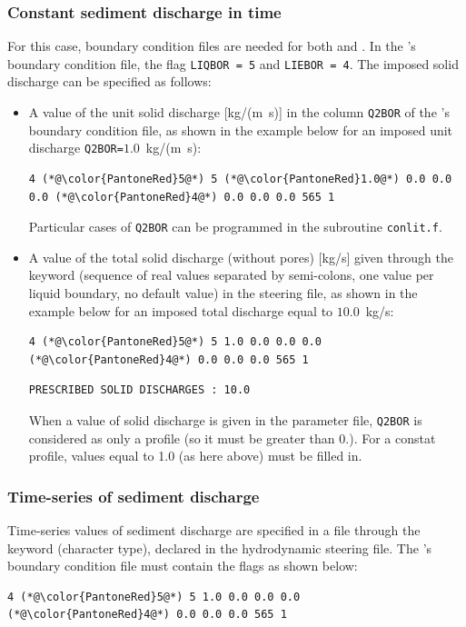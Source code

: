 \subsubsection{Constant sediment discharge in time}
For this case, boundary condition files are needed for both  and \gaia{}. In the \gaia{}'s boundary condition file, the flag \texttt{LIQBOR = 5} and \texttt{LIEBOR = 4}. The imposed solid discharge can be specified as follows:
\begin{itemize}
\item A value of the unit solid discharge [kg/(m~s)] in the column \texttt{Q2BOR} of the \gaia{}'s boundary condition file, as shown in the example below for an imposed unit discharge \texttt{Q2BOR=}$1.0$~kg/(m~s):
\begin{lstlisting}[frame=trBL]
4 (*@\color{PantoneRed}5@*) 5 (*@\color{PantoneRed}1.0@*) 0.0 0.0 0.0 (*@\color{PantoneRed}4@*) 0.0 0.0 0.0 565 1
\end{lstlisting}

Particular cases of \texttt{Q2BOR} can be programmed in the subroutine \texttt{conlit.f}.

\item A value of the total solid discharge (without pores) [kg/s] given through the keyword  (sequence of real values separated by semi-colons, one value per liquid boundary, no default value) in the steering file, as shown in the example below for an imposed total discharge equal to $10.0$~kg/s:
\begin{lstlisting}[frame=trBL]
4 (*@\color{PantoneRed}5@*) 5 1.0 0.0 0.0 0.0 (*@\color{PantoneRed}4@*) 0.0 0.0 0.0 565 1
\end{lstlisting}
\begin{lstlisting}[frame=trBL]
PRESCRIBED SOLID DISCHARGES : 10.0
\end{lstlisting}
When a value of solid discharge is given in the parameter file, \texttt{Q2BOR} is considered as only a profile (so it must be greater than 0.). For a constat profile, values equal to 1.0 (as here above) must be filled in.

\end{itemize}

\subsubsection{Time-series of sediment discharge}
Time-series values of sediment discharge are specified in a file through the keyword  (character type), declared in the hydrodynamic steering file. The \gaia{}'s boundary condition file must contain the flags as shown below:
\begin{lstlisting}[frame=trBL]
4 (*@\color{PantoneRed}5@*) 5 1.0 0.0 0.0 0.0 (*@\color{PantoneRed}4@*) 0.0 0.0 0.0 565 1
\end{lstlisting}

